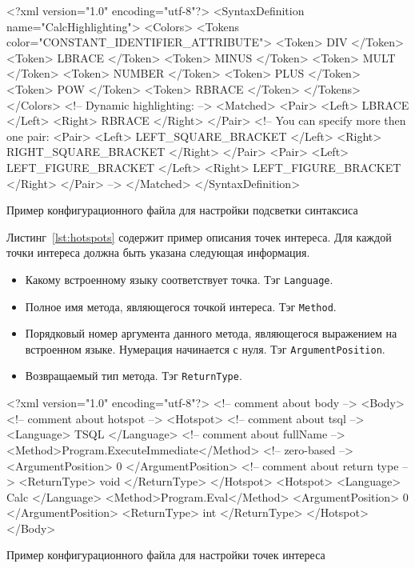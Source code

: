 \begin{listing}[H]
    \begin{pyglist}[language=xml,numbers=left,numbersep=5pt]
<?xml version="1.0" encoding="utf-8"?>
<SyntaxDefinition name="CalcHighlighting">
    <Colors>
        <Tokens color="CONSTANT_IDENTIFIER_ATTRIBUTE">
            <Token> DIV </Token>
            <Token> LBRACE </Token>
            <Token> MINUS </Token>
            <Token> MULT </Token>
            <Token> NUMBER </Token>
            <Token> PLUS </Token>
            <Token> POW </Token>
            <Token> RBRACE </Token>
        </Tokens>
    </Colors>
<!-- Dynamic highlighting: -->
    <Matched>
        <Pair>
            <Left> LBRACE </Left>
            <Right> RBRACE </Right>
        </Pair>
<!-- You can specify more then one pair:        
        <Pair>
            <Left> LEFT_SQUARE_BRACKET </Left>
            <Right> RIGHT_SQUARE_BRACKET </Right>
        </Pair>
        <Pair>
            <Left> LEFT_FIGURE_BRACKET </Left>
            <Right> LEFT_FIGURE_BRACKET </Right>
        </Pair>
-->        
    </Matched>
</SyntaxDefinition>
    \end{pyglist}
\caption{Пример конфигурационного файла для настройки подсветки синтаксиса}
\label{lst:codeHighlighting}
\end{listing}

Листинг~\ref{lst:hotspots} содержит пример описания точек интереса. Для каждой точки интереса должна быть указана следующая информация.
\begin{itemize}
    \item Какому встроенному языку соответствует точка. Тэг \verb|Language|.
    \item Полное имя метода, являющегося точкой интереса. Тэг \verb|Method|.
    \item Порядковый номер аргумента данного метода, являющегося выражением на встроенном языке. Нумерация начинается с нуля. Тэг \verb|ArgumentPosition|. 
    \item Возвращаемый тип метода.  Тэг \verb|ReturnType|. 
\end{itemize}

\begin{listing}[H]
    \begin{pyglist}[language=xml,numbers=left,numbersep=5pt]
<?xml version="1.0" encoding="utf-8"?>
<!-- comment about body -->
<Body>
    <!-- comment about hotspot -->
  <Hotspot>
      <!-- comment about tsql -->
      <Language> TSQL </Language>
      <!-- comment about fullName -->
      <Method>Program.ExecuteImmediate</Method>
      <!-- zero-based -->
      <ArgumentPosition> 0 </ArgumentPosition>
      <!-- comment about return type -->
      <ReturnType> void </ReturnType>
  </Hotspot>
  <Hotspot>
      <Language> Calc </Language>
      <Method>Program.Eval</Method>
      <ArgumentPosition> 0 </ArgumentPosition>
      <ReturnType> int </ReturnType>
  </Hotspot>
</Body>
    \end{pyglist}
\caption{Пример конфигурационного файла для настройки точек интереса}
\label{lst:hotspots}
\end{listing}


